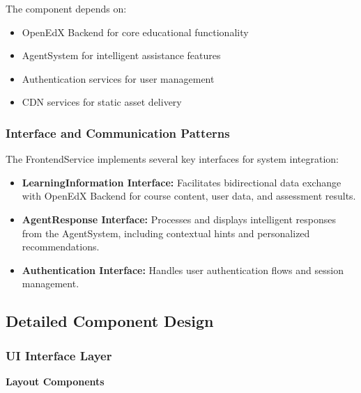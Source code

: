 \documentclass[../Main.tex]{subfiles}
\begin{document}
{{	The component depends on:
	\begin{itemize}
		\item OpenEdX Backend for core educational functionality

		\item AgentSystem for intelligent assistance features

		\item Authentication services for user management

		\item CDN services for static asset delivery
	\end{itemize}

	\subsubsection{Interface and Communication Patterns}
	\label{section:4.3.1.2_interface_and_communication_patterns} The
	FrontendService implements several key interfaces for system integration:

	\begin{itemize}
		\item \textbf{LearningInformation Interface:} Facilitates bidirectional data
			exchange with OpenEdX Backend for course content, user data, and
			assessment results.

		\item \textbf{AgentResponse Interface:} Processes and displays intelligent
			responses from the AgentSystem, including contextual hints and personalized
			recommendations.

		\item \textbf{Authentication Interface:} Handles user authentication flows
			and session management.
	\end{itemize}

	\subsection{Detailed Component Design}
	\label{section:4.3.2_detailed_component_design}
	\subsubsection{UI Interface Layer}
	\label{section:4.3.2.1_ui_interface_layer} \textbf{Layout Components}

}}
\end{document}
